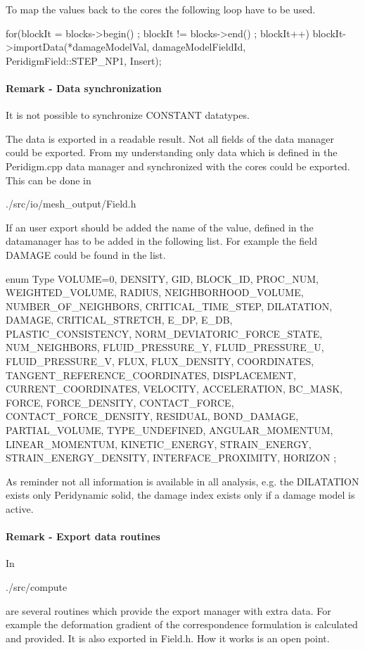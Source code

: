 To map the values back to the cores the following loop have to be used.
\begingroup
\lstset{breaklines=true}
\begin{code}
    for(blockIt = blocks->begin() ; blockIt != blocks->end() ; blockIt++){
      blockIt->importData(*damageModelVal, damageModelFieldId, PeridigmField::STEP_NP1, Insert);
    }
\end{code}
\endgroup  

\paragraph{Remark - Data synchronization}
It is not possible to synchronize CONSTANT datatypes.

The data is exported in a \paraviewname readable result. Not all fields of the data manager could be exported. From my understanding only data which is defined in the Peridigm.cpp data manager and synchronized with the cores could be exported. This can be done in
\begingroup
\lstset{breaklines=true}
\begin{code}
./src/io/mesh\_output/Field.h
\end{code}
\endgroup
If an user export should be added the name of the value, defined in the datamanager has to be added in the following list. For example the field DAMAGE could be found in the list.
\begingroup
\lstset{breaklines=true}
\begin{code}
enum Type {
  VOLUME=0,
  DENSITY,
  GID,
  BLOCK_ID,
  PROC_NUM,
  WEIGHTED_VOLUME,
  RADIUS,
  NEIGHBORHOOD_VOLUME,
  NUMBER_OF_NEIGHBORS,
  CRITICAL_TIME_STEP,
  DILATATION,
  DAMAGE,
  CRITICAL_STRETCH,
  E_DP,
  E_DB,
  PLASTIC_CONSISTENCY,
  NORM_DEVIATORIC_FORCE_STATE,
  NUM_NEIGHBORS,
  FLUID_PRESSURE_Y,
  FLUID_PRESSURE_U,
  FLUID_PRESSURE_V,
  FLUX,
  FLUX_DENSITY,
  COORDINATES,
  TANGENT_REFERENCE_COORDINATES,
  DISPLACEMENT,
  CURRENT_COORDINATES,
  VELOCITY,
  ACCELERATION,
  BC_MASK,
  FORCE,
  FORCE_DENSITY,
  CONTACT_FORCE,
  CONTACT_FORCE_DENSITY,
  RESIDUAL,
  BOND_DAMAGE,
  PARTIAL_VOLUME,
  TYPE_UNDEFINED,
  ANGULAR_MOMENTUM,
  LINEAR_MOMENTUM,
  KINETIC_ENERGY,
  STRAIN_ENERGY,
  STRAIN_ENERGY_DENSITY,
  INTERFACE_PROXIMITY,
  HORIZON
};
\end{code}
\endgroup
As reminder not all information is available in all analysis, e.g. the DILATATION exists only %
Peridynamic solid, the damage index exists only if a damage model is active.

\paragraph{Remark - Export data routines}
In 
\begingroup
\lstset{breaklines=true}
\begin{code}
./src/compute
\end{code}
\endgroup
are several routines which provide the export manager with extra data. For example the deformation gradient of the correspondence formulation is calculated and provided. It is also exported in Field.h. 
How it works is an open point.
